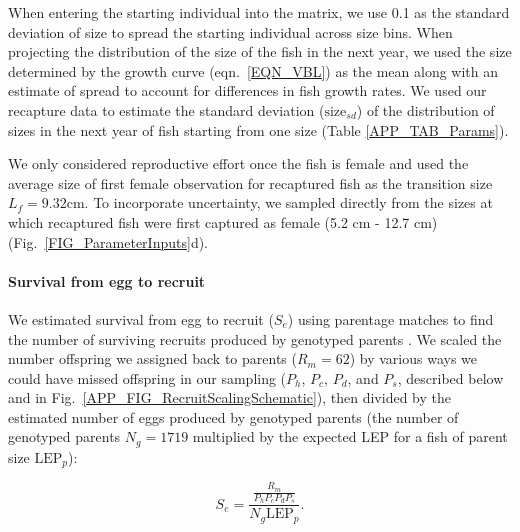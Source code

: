 \documentclass[12pt, oneside]{article}   	%
\begin{document}
When entering the starting individual into the matrix, we use 0.1 as the standard deviation of size to spread the starting individual across size bins. When projecting the distribution of the size of the fish in the next year, we used the size determined by the growth curve (eqn.\ \ref{EQN_VBL}) as the mean along with an estimate of spread to account for differences in fish growth rates. We used our recapture data to estimate the standard deviation ($\text{size}_{sd}$) of the distribution of sizes in the next year of fish starting from one size (Table \ref{APP_TAB_Params}). 

We only considered reproductive effort once the fish is female and used the average size of first female observation for recaptured fish as the transition size $L_f = 9.32 \text{cm}$. To incorporate uncertainty, we sampled directly from the sizes at which recaptured fish were first captured as female (5.2 cm - 12.7 cm) (Fig.\ \ref{FIG_ParameterInputs}d).

\paragraph*{Survival from egg to recruit}

We estimated survival from egg to recruit ($S_e$) using parentage matches to find the number of surviving recruits produced by genotyped parents \citep[similar to the method in][]{johnson2018integrating}. We scaled the number offspring we assigned back to parents ($R_m = 62$) by various ways we could have missed offspring in our sampling ($P_h$, $P_c$, $P_d$, and $P_s$, described below and in Fig.\ \ref{APP_FIG_RecruitScalingSchematic}), then divided by the estimated number of eggs produced by genotyped parents (the number of genotyped parents $N_g = 1719$ multiplied by the expected LEP for a fish of parent size $\text{LEP}_p$):

\begin{equation}
S_e = \frac{\frac{R_m}{P_h P_c P_d P_s}}{N_g \text{LEP}_p}. \label{EQN_EggRecruitSurv}
\end{equation}
\end{document}
